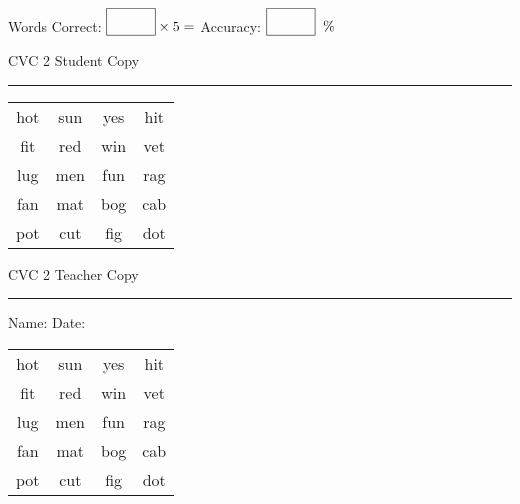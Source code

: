 \documentclass{memoir}
\begin{document}
\small

Words Correct: $\fbox{\phantom{\huge 100}} \times 5 = $ Accuracy: $\fbox{\phantom{\huge 100}}\;\; \%$ 

\vfill

\newpage


\footnotesize \noindent
CVC 2 \hfill Student Copy
\smallskip
\hrule

\Large

\setlength{\tabcolsep}{14pt}
\def\arraystretch{2}

{\selectfont


\begin{vplace}[0.5]
\begin{center}
\begin{tabular}{cccc}
hot & sun & yes & hit \\
fit & red & win & vet \\
lug & men & fun & rag \\
fan & mat & bog & cab \\
pot & cut & fig & dot \\
\end{tabular}
\end{center}
\end{vplace}

}

\newpage

\footnotesize \noindent
CVC 2 \hfill Teacher Copy
\smallskip
\hrule

\small

\vfill

\noindent
Name: \underline{\hspace{1.75in}} \hfill Date: \underline{\hspace{1in}}

\Large

{\selectfont


\begin{vplace}[0.5]
\begin{center}
\begin{tabular}{cccc}
hot & sun & yes & hit \\
fit & red & win & vet \\
lug & men & fun & rag \\
fan & mat & bog & cab \\
pot & cut & fig & dot \\
\end{tabular}
\end{center}
\end{vplace}



}
\end{document}
